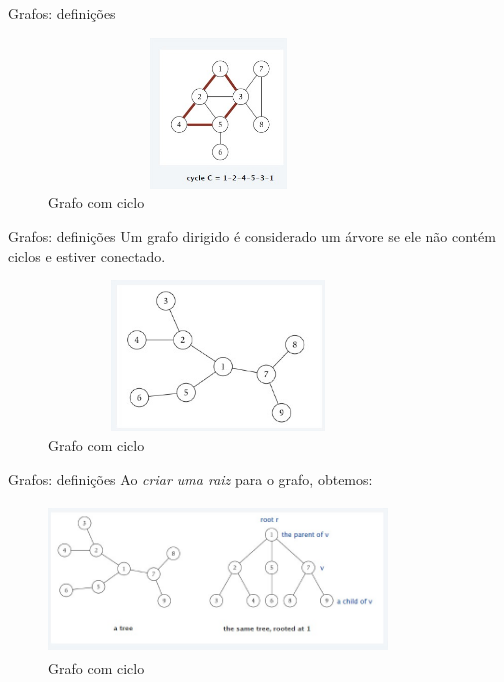 \begin{frame}
	\begin{block}{Grafos: definições}
		\begin{figure}[!htb]
			\centering	  				
			\includegraphics[height=4cm, width = 9cm]{./pic/ciclo.jpg}
			\caption{Grafo com ciclo}
			\label{fig_pilha}
		\end{figure}
	\end{block}
\end{frame}

\begin{frame}
	\begin{block}{Grafos: definições}
		Um grafo dirigido é considerado um árvore se ele não contém ciclos e estiver conectado.
		\begin{figure}[!htb]
			\centering	  
			\includegraphics[height=4cm, width = 9cm]{./pic/arvoreGrafo.jpg}
			\caption{Grafo com ciclo}
			\label{fig_pilha}
		\end{figure}
	\end{block}
\end{frame}

\begin{frame}
	\begin{block}{Grafos: definições}
		Ao \emph{criar uma raiz} para o grafo, obtemos:
		\begin{figure}[!htb]
			\centering	  
			\includegraphics[height=4cm, width = 9cm]{./pic/grafoArvore2.jpg}
			\caption{Grafo com ciclo}
			\label{fig_pilha}
		\end{figure}
	\end{block}
\end{frame}

